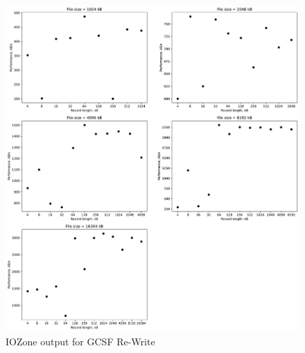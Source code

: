 \begin{figure}[!htb]
	\label{fig:app_benchgcsfs_re_write}
	\begin{center}
		\includegraphics[width=1.0\textwidth]{figures/benchmarking/gcsf/Re-Write.pdf}
	\end{center}
	\caption{IOZone output for GCSF Re-Write}
\end{figure}

